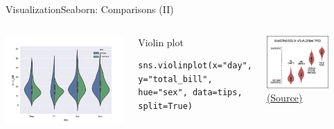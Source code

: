 \documentclass[10pt,compress]{beamer} %
\begin{document}
\begin{frame}[fragile]{Visualization}{Seaborn: Comparisons (II)}
	\begin{columns}
	\includegraphics[width=\textwidth]{figs/sns-violin2.png}\\
	\begin{exampleblock}{\footnotesize{Violin plot}}
	\vspace{-0.2cm} 
	\begin{lstlisting}[basicstyle=\tiny]
	sns.violinplot(x="day", y="total_bill", hue="sex", data=tips, split=True)
	\end{lstlisting}
	\vspace{-0.2cm} 
	\end{exampleblock}

	\centering \includegraphics[width=0.7\textwidth]{figs/violin_plots.png}\\
	\tiny \centering \href{https://xkcd.com/1967/}{(Source)}
	\end{columns}
\end{frame}
\end{document}
